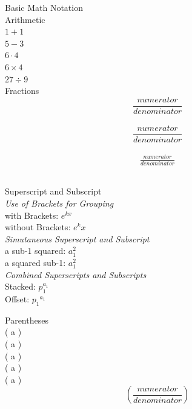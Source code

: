 \documentclass[10pt]{article}
\begin{document}
    \begin{center}
        {\LARGE Basic Math Notation\\ Arithmetic \\}
        \(1+1\)\\
        \(5-3\)\\
        \(6 \cdot 4\) \\
        \(6 \times 4\) \\
        \(27 \div 9 \) \\ %
        {\LARGE Fractions \\}
        \[\frac{numerator}{denominator}\]\\
        \[\dfrac{numerator}{denominator}\]\\
        \[\tfrac{numerator}{denominator}\]\\
    \end{center}


    \begin{center}
        {\LARGE Superscript and Subscript}\\[0.5cm]
        \emph{\Large{Use of Brackets for Grouping}}\\[1cm]
        with Brackets: \(e^{kx}\)\\[0.25cm]
        without Brackets: \(e^kx\)\\[1cm]
        \emph{\Large{Simutaneous Superscript and Subscript}}\\[0.5cm]
        a sub-1 squared: \(a_1^2\)\\[0.25cm]
        a squared sub-1: \(a^2_1\)\\[1cm]
        \emph{\Large{Combined Superscripts and Subscripts}}\\[0.5cm]
        Stacked: \(p_1^{a_1}\)\\[0.25cm]
        Offset: \({p_1}^{a_1}\)\newpage
    \end{center}


    \begin{center}
        {\LARGE Parentheses}\\[0.5cm]
        ( a )\\[0.25cm]
        \big( a \big)\\[0.25cm]
        \Big( a \Big)\\[0.25cm]
        \bigg( a \bigg)\\[0.25cm]
        \Bigg( a \Bigg)\\[0.25cm]
        \[ \left( \frac{numerator}{denominator} \right) \]
    \end{center}
\end{document}
